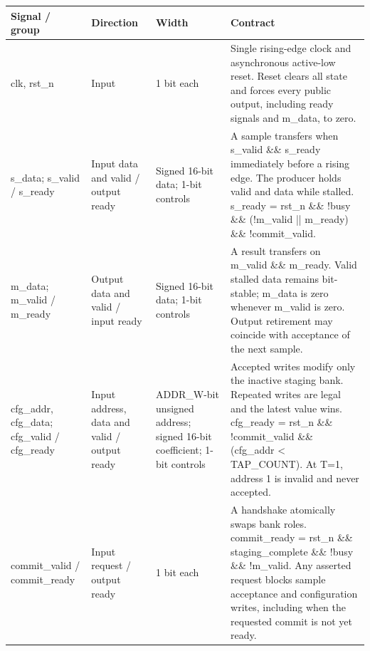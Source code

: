\documentclass[11pt,a4paper]{article}
\begin{document}
{\small\renewcommand{\arraystretch}{1.18}\begin{longtable}{@{}L{0.21\textwidth}|L{0.12\textwidth}|L{0.12\textwidth}|L{0.45\textwidth}@{}}\toprule

\textbf{Signal /\allowbreak{} group} & \textbf{Direction} & \textbf{Width} & \textbf{Contract}\\\midrule\endhead

clk,\allowbreak{} rst\_\allowbreak{}n & Input & 1 bit each & Single rising-edge clock and asynchronous active-low reset. Reset clears all state and forces every public output,\allowbreak{} including ready signals and m\_\allowbreak{}data,\allowbreak{} to zero.\\[2pt]\hline

s\_\allowbreak{}data; s\_\allowbreak{}valid /\allowbreak{} s\_\allowbreak{}ready & Input data and valid /\allowbreak{} output ready & Signed 16-bit data; 1-bit controls & A sample transfers when s\_\allowbreak{}valid \&\& s\_\allowbreak{}ready immediately before a rising edge. The producer holds valid and data while stalled. s\_\allowbreak{}ready =\allowbreak{} rst\_\allowbreak{}n \&\& !busy \&\& (\allowbreak{}!m\_\allowbreak{}valid || m\_\allowbreak{}ready)\allowbreak{} \&\& !commit\_\allowbreak{}valid.\\[2pt]\hline

m\_\allowbreak{}data; m\_\allowbreak{}valid /\allowbreak{} m\_\allowbreak{}ready & Output data and valid /\allowbreak{} input ready & Signed 16-bit data; 1-bit controls & A result transfers on m\_\allowbreak{}valid \&\& m\_\allowbreak{}ready. Valid stalled data remains bit-stable; m\_\allowbreak{}data is zero whenever m\_\allowbreak{}valid is zero. Output retirement may coincide with acceptance of the next sample.\\[2pt]\hline

cfg\_\allowbreak{}addr,\allowbreak{} cfg\_\allowbreak{}data; cfg\_\allowbreak{}valid /\allowbreak{} cfg\_\allowbreak{}ready & Input address,\allowbreak{} data and valid /\allowbreak{} output ready & ADDR\_\allowbreak{}W-bit unsigned address; signed 16-bit coefficient; 1-bit controls & Accepted writes modify only the inactive staging bank. Repeated writes are legal and the latest value wins. cfg\_\allowbreak{}ready =\allowbreak{} rst\_\allowbreak{}n \&\& !commit\_\allowbreak{}valid \&\& (\allowbreak{}cfg\_\allowbreak{}addr < TAP\_\allowbreak{}COUNT)\allowbreak{}. At T=\allowbreak{}1,\allowbreak{} address 1 is invalid and never accepted.\\[2pt]\hline

commit\_\allowbreak{}valid /\allowbreak{} commit\_\allowbreak{}ready & Input request /\allowbreak{} output ready & 1 bit each & A handshake atomically swaps bank roles. commit\_\allowbreak{}ready =\allowbreak{} rst\_\allowbreak{}n \&\& staging\_\allowbreak{}complete \&\& !busy \&\& !m\_\allowbreak{}valid. Any asserted request blocks sample acceptance and configuration writes,\allowbreak{} including when the requested commit is not yet ready.\\[2pt]\hline

\bottomrule\end{longtable}}
\end{document}
